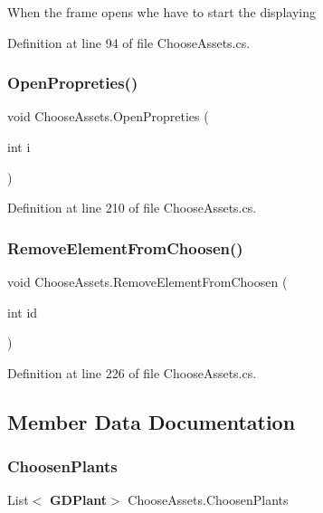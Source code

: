 When the frame opens whe have to start the displaying 



Definition at line 94 of file Choose\+Assets.\+cs.

\mbox{\label{class_choose_assets_aefc9eb667ed65c233960a67beb60637b}} 
\subsubsection{Open\+Propreties()}
{\footnotesize\ttfamily void Choose\+Assets.\+Open\+Propreties (\begin{DoxyParamCaption}\item[{int}]{i }\end{DoxyParamCaption})}



Definition at line 210 of file Choose\+Assets.\+cs.

\mbox{\label{class_choose_assets_aa0273937884f0a001e8fcfdaf00bf5cb}} 
\subsubsection{Remove\+Element\+From\+Choosen()}
{\footnotesize\ttfamily void Choose\+Assets.\+Remove\+Element\+From\+Choosen (\begin{DoxyParamCaption}\item[{int}]{id }\end{DoxyParamCaption})}



Definition at line 226 of file Choose\+Assets.\+cs.



\subsection{Member Data Documentation}
\mbox{\label{class_choose_assets_ad6e56c946cc17d9f62b48be017d269a6}} 
\subsubsection{Choosen\+Plants}
{\footnotesize\ttfamily List$<$\textbf{ G\+D\+Plant}$>$ Choose\+Assets.\+Choosen\+Plants}



